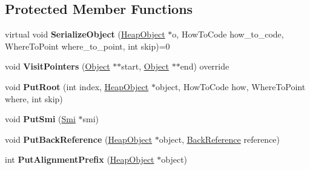 \subsection*{Protected Member Functions}
\begin{DoxyCompactItemize}
\item 
virtual void {\bfseries Serialize\+Object} (\hyperlink{classv8_1_1internal_1_1_heap_object}{Heap\+Object} $\ast$o, How\+To\+Code how\+\_\+to\+\_\+code, Where\+To\+Point where\+\_\+to\+\_\+point, int skip)=0\hypertarget{classv8_1_1internal_1_1_serializer_a98c44c473660f94be2ec5e3762e2c547}{}\label{classv8_1_1internal_1_1_serializer_a98c44c473660f94be2ec5e3762e2c547}

\item 
void {\bfseries Visit\+Pointers} (\hyperlink{classv8_1_1internal_1_1_object}{Object} $\ast$$\ast$start, \hyperlink{classv8_1_1internal_1_1_object}{Object} $\ast$$\ast$end) override\hypertarget{classv8_1_1internal_1_1_serializer_a0efa92f29805d3134e88fd291a704021}{}\label{classv8_1_1internal_1_1_serializer_a0efa92f29805d3134e88fd291a704021}

\item 
void {\bfseries Put\+Root} (int index, \hyperlink{classv8_1_1internal_1_1_heap_object}{Heap\+Object} $\ast$object, How\+To\+Code how, Where\+To\+Point where, int skip)\hypertarget{classv8_1_1internal_1_1_serializer_af56867deddb051bccdcd959b61ff4def}{}\label{classv8_1_1internal_1_1_serializer_af56867deddb051bccdcd959b61ff4def}

\item 
void {\bfseries Put\+Smi} (\hyperlink{classv8_1_1internal_1_1_smi}{Smi} $\ast$smi)\hypertarget{classv8_1_1internal_1_1_serializer_a4deaad7fb6a2e99e0614221c20b0b8ac}{}\label{classv8_1_1internal_1_1_serializer_a4deaad7fb6a2e99e0614221c20b0b8ac}

\item 
void {\bfseries Put\+Back\+Reference} (\hyperlink{classv8_1_1internal_1_1_heap_object}{Heap\+Object} $\ast$object, \hyperlink{classv8_1_1internal_1_1_back_reference}{Back\+Reference} reference)\hypertarget{classv8_1_1internal_1_1_serializer_ac6a3f2f5a1bbee65dec2539252efbbd3}{}\label{classv8_1_1internal_1_1_serializer_ac6a3f2f5a1bbee65dec2539252efbbd3}

\item 
int {\bfseries Put\+Alignment\+Prefix} (\hyperlink{classv8_1_1internal_1_1_heap_object}{Heap\+Object} $\ast$object)\hypertarget{classv8_1_1internal_1_1_serializer_ab2d4d6dc19c242d9e0ea92aaa0ac55df}{}\label{classv8_1_1internal_1_1_serializer_ab2d4d6dc19c242d9e0ea92aaa0ac55df}


\end{DoxyCompactItemize}
